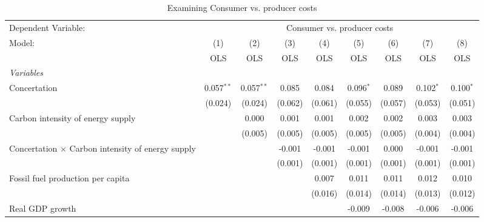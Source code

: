 
\begin{table}[htbp]
   \caption{Examining Consumer vs. producer costs}
   \centering
   \begin{tabular}{lcccccccc}
      \toprule
      Dependent Variable: & \multicolumn{8}{c}{Consumer vs. producer costs}\\
      Model:                                                   & (1)          & (2)          & (3)     & (4)     & (5)         & (6)     & (7)         & (8)\\  
                                                               &  OLS         & OLS          & OLS     & OLS     & OLS         & OLS     & OLS         & OLS\\  
      \midrule
      \emph{Variables}\\
      Concertation                                             & 0.057$^{**}$ & 0.057$^{**}$ & 0.085   & 0.084   & 0.096$^{*}$ & 0.089   & 0.102$^{*}$ & 0.100$^{*}$\\   
                                                               & (0.024)      & (0.024)      & (0.062) & (0.061) & (0.055)     & (0.057) & (0.053)     & (0.051)\\   
      Carbon intensity of energy supply                        &              & 0.000        & 0.001   & 0.001   & 0.002       & 0.002   & 0.003       & 0.003\\   
                                                               &              & (0.005)      & (0.005) & (0.005) & (0.005)     & (0.005) & (0.004)     & (0.004)\\   
      Concertation $\times$ Carbon intensity of energy supply  &              &              & -0.001  & -0.001  & -0.001      & 0.000   & -0.001      & -0.001\\   
                                                               &              &              & (0.001) & (0.001) & (0.001)     & (0.001) & (0.001)     & (0.001)\\   
      Fossil fuel production per capita                        &              &              &         & 0.007   & 0.011       & 0.011   & 0.012       & 0.010\\   
                                                               &              &              &         & (0.016) & (0.014)     & (0.014) & (0.013)     & (0.012)\\   
      Real GDP growth                                          &              &              &         &         & -0.009      & -0.008  & -0.006      & -0.006\\   

\end{tabular}
\end{table}
